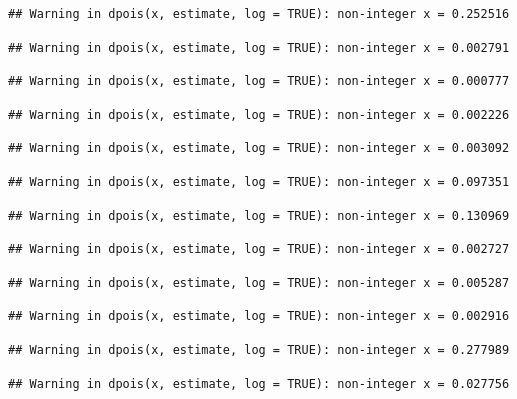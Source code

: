 \documentclass[]{article}
\begin{document}
\begin{verbatim}
## Warning in dpois(x, estimate, log = TRUE): non-integer x = 0.252516
\end{verbatim}

\begin{verbatim}
## Warning in dpois(x, estimate, log = TRUE): non-integer x = 0.002791
\end{verbatim}

\begin{verbatim}
## Warning in dpois(x, estimate, log = TRUE): non-integer x = 0.000777
\end{verbatim}

\begin{verbatim}
## Warning in dpois(x, estimate, log = TRUE): non-integer x = 0.002226
\end{verbatim}

\begin{verbatim}
## Warning in dpois(x, estimate, log = TRUE): non-integer x = 0.003092
\end{verbatim}

\begin{verbatim}
## Warning in dpois(x, estimate, log = TRUE): non-integer x = 0.097351
\end{verbatim}

\begin{verbatim}
## Warning in dpois(x, estimate, log = TRUE): non-integer x = 0.130969
\end{verbatim}

\begin{verbatim}
## Warning in dpois(x, estimate, log = TRUE): non-integer x = 0.002727
\end{verbatim}

\begin{verbatim}
## Warning in dpois(x, estimate, log = TRUE): non-integer x = 0.005287
\end{verbatim}

\begin{verbatim}
## Warning in dpois(x, estimate, log = TRUE): non-integer x = 0.002916
\end{verbatim}

\begin{verbatim}
## Warning in dpois(x, estimate, log = TRUE): non-integer x = 0.277989
\end{verbatim}

\begin{verbatim}
## Warning in dpois(x, estimate, log = TRUE): non-integer x = 0.027756
\end{verbatim}
\end{document}
